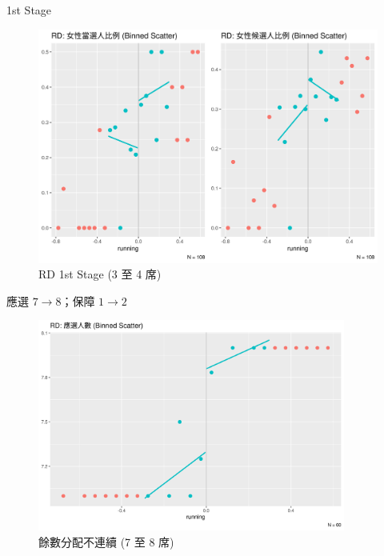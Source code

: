 \documentclass[
  10pt,
  ignorenonframetext,
  aspectratio=43,
]{beamer}
\begin{document}
\begin{frame}
\begin{block}{1st Stage}
\protect\hypertarget{st-stage}{}
\begin{figure}
\centering
\includegraphics[width=1\textwidth,height=\textheight]{assets/treatments_3to4.png}
\caption{RD 1st Stage (3 至 4 席)}
\end{figure}
\end{block}
\end{frame}

\begin{frame}{應選 \(7 \rightarrow 8\)；保障 \(1 \rightarrow 2\)}
\protect\hypertarget{ux61c9ux9078-7-rightarrow-8ux4fddux969c-1-rightarrow-2}{}
\begin{figure}
\centering
\includegraphics[width=0.9\textwidth,height=\textheight]{assets/7to8.png}
\caption{餘數分配不連續 (7 至 8 席)}
\end{figure}
\end{frame}
\end{document}
